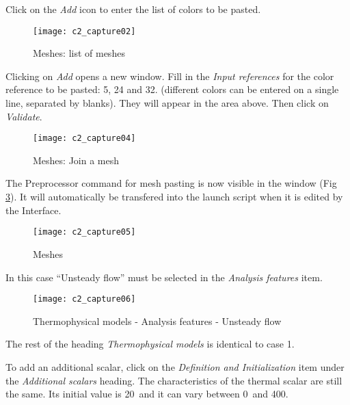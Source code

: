Click on the {\itshape Add} icon to enter the list of colors to be pasted.

\begin{figure}[h!]
\begin{center}
\texttt{[image: c2\_capture02]}
\caption{Meshes: list of meshes}
\label{fig2_e2}
\end{center}
\end{figure}


\newpage
Clicking on {\itshape Add} opens a new window. Fill in the
{\itshape Input references} for the color reference to be pasted: 5, 24 and 32.
(different colors can be entered on a single line, separated by blanks). They
will appear in the area above. Then click on {\itshape Validate}.


\begin{figure}[h!]
\begin{center}
\texttt{[image: c2\_capture04]}
\caption{Meshes: Join a mesh}
\label{fig4_e2}
\end{center}
\end{figure}


\newpage
The Preprocessor command for mesh pasting is now visible in the window (Fig
\ref{fig5_e2}). It will automatically be transfered into the launch script when
it is edited by the Interface.

\begin{figure}[h!]
\begin{center}
\texttt{[image: c2\_capture05]}
\caption{Meshes}
\label{fig5_e2}
\end{center}
\end{figure}


\newpage
In this case ``Unsteady flow'' must be selected in the
{\itshape Analysis features} item.

\begin{figure}[h!]
\begin{center}
\texttt{[image: c2\_capture06]}
\caption{Thermophysical models - Analysis features - Unsteady flow}
\label{fig6_e2}
\end{center}
\end{figure}

The rest of the heading {\itshape Thermophysical models} is identical to case
1.


\newpage
To add an additional scalar, click on the
{\itshape Definition and Initialization} item under the
{\itshape Additional scalars} heading.
The characteristics of the thermal scalar are still the
same. Its initial value is 20\degresC\ and it can vary between
0\degresC\ and 400\degresC.

